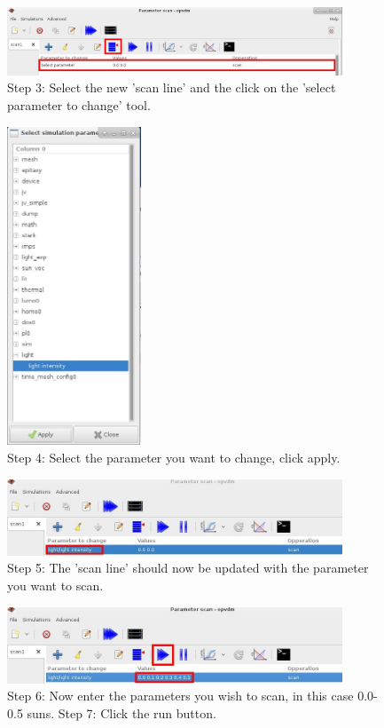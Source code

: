 \documentclass[11pt]{article}
\begin{document}
\begin{figure}[ht!]
\centering
\includegraphics[width=100mm]{./images/3.jpg}
\caption*{Step 3: Select the new 'scan line' and the click on the 'select parameter to change' tool.}
\label{overflow}
\end{figure}


\begin{figure}[ht!]
\centering
\includegraphics[width=40mm]{./images/4.jpg}
\caption*{Step 4: Select the parameter you want to change, click apply.}
\end{figure}


\begin{figure}[ht!]
\centering
\includegraphics[width=100mm]{./images/5.jpg}
\caption*{Step 5: The 'scan line' should now be updated with the parameter you want to scan.}
\end{figure}


\begin{figure}[ht!]
\centering
\includegraphics[width=100mm]{./images/6.jpg}
\caption*{Step 6: Now enter the parameters you wish to scan, in this case 0.0-0.5 suns.
Step 7: Click the run button.}
\end{figure}
\end{document}
